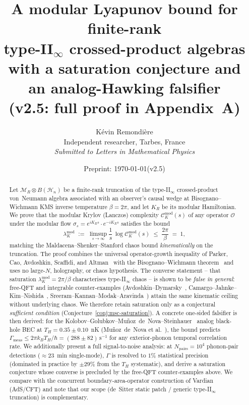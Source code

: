 \documentclass[12pt,a4paper]{article}
\title{\textbf{A modular Lyapunov bound for finite-rank\\
       type-II$_\infty$ crossed-product algebras}\\[6pt]
       \large with a saturation conjecture and an analog-Hawking falsifier\\[4pt]
       \normalsize (v2.5: full proof in Appendix~A)}
\author{%
  K\'evin Remondi\`ere\\[2pt]
  \small Independent researcher, Tarbes, France\\[2pt]
  \small \textit{Submitted to Letters in Mathematical Physics}
}
\date{Preprint: \today\quad(v2.5)}
\begin{document}
\maketitle

\begin{abstract}
Let $\mathcal{M}_R \otimes B(\mathcal{H}_n)$ be a finite-rank truncation of
the type-II$_\infty$ crossed-product von~Neumann algebra associated with an
observer's causal wedge at Bisognano--Wichmann KMS inverse temperature
$\beta = 2\pi$, and let $K_R$ be its modular Hamiltonian.
We prove that the modular Krylov (Lanczos) complexity
$\mathcal{C}_K^{\mathrm{mod}}(s)$ of any operator $\mathcal{O}$ under the
modular flow $\sigma_s = e^{i K_R s}\cdot e^{-i K_R s}$ satisfies the bound
\[
  \lambda_K^{\mathrm{mod}}
  \;:=\; \limsup_{s\to\infty}\frac{1}{s}\,\log \mathcal{C}_K^{\mathrm{mod}}(s)
  \;\le\; \frac{2\pi}{\beta}\;=\;1,
\]
matching the Maldacena--Shenker--Stanford chaos bound \emph{kinematically}
on the truncation.
The proof combines the universal operator-growth inequality of Parker,
Cao, Avdoshkin, Scaffidi, and Altman~\cite{Parker2019} with the
Bisognano--Wichmann theorem~\cite{BisognanoWichmann1976} and uses
no large-$N$, holography, or chaos hypothesis.
The converse statement -- that saturation $\lambda_K^{\mathrm{mod}} =
2\pi/\beta$ characterises type-II$_\infty$ chaos -- is shown to be
\emph{false in general}: free-QFT and integrable counter-examples
(Avdoshkin--Dymarsky~\cite{AvdoshkinDymarsky2019},
Camargo--Jahnke--Kim--Nishida~\cite{Camargo2023},
Sreeram--Kannan--Modak--Aravinda~\cite{Sreeram2025})
attain the same kinematic ceiling without underlying chaos.
We therefore retain saturation only as a conjectural \emph{sufficient
condition} (Conjecture~\ref{conj:msc-saturation}).
A concrete one-sided falsifier is then derived: for the
Kolobov--Golubkov--Mu\~{n}oz~de~Nova--Steinhauer~\cite{Kolobov2021}
analog black-hole BEC at $T_H = 0.35 \pm 0.10$~nK
(Mu\~{n}oz~de~Nova et al.~\cite{Steinhauer2019}), the bound predicts
$\Gamma_{\mathrm{meas}} \le 2\pi k_B T_H/\hbar = (288 \pm 82)\,\mathrm{s}^{-1}$
for any exterior-phonon temporal correlation rate.
We additionally present a full signal-to-noise analysis: at
$N_{\mathrm{pairs}} = 10^4$ phonon-pair detections ($\approx 23$~min
single-mode), $\Gamma$ is resolved to $1\%$ statistical precision
(dominated in practice by $\pm 29\%$ from the $T_H$ systematic),
and derive a saturation conjecture whose converse is precluded by
the free-QFT counter-examples above.
We compare with the concurrent boundary-area-operator construction of
Vardian~\cite{Vardian2026} (AdS/CFT) and note that our scope (de~Sitter
static patch / generic type-II$_\infty$ truncation) is complementary.
\end{abstract}
\end{document}
